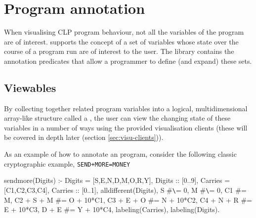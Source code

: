 %
% 
% 
% 
% 

\chapter{Program annotation}
When visualising CLP program behaviour, not all the variables of the
program are of interest.  {\eclipse} supports the concept of a set of
\viewable{} variables whose state over the course of a program run are
of interest to the user.  The library
 contains the
annotation predicates that allow a programmer to define (and expand)
these \viewable{} sets.


\section{Viewables}
\label{sec:viewables}
By collecting together related program
variables into a logical, multidimensional array-like structure called
a \viewable{}, the user can view the changing state of these variables
in a number of ways using the provided visualisation clients (these
will be covered in depth later (section \ref{sec:visu-clients})).

As an example of how to annotate an {\eclipse} program, consider the
following classic cryptographic example, \texttt{SEND+MORE=MONEY}

\begin{code}
sendmore(Digits) :-
    Digits = [S,E,N,D,M,O,R,Y],
    Digits :: [0..9],
    Carries = [C1,C2,C3,C4],
    Carries :: [0..1],
    alldifferent(Digits),
    S #\verb+\+= 0,
    M #\verb+\+= 0,
    C1         #= M,
    C2 + S + M #= O + 10*C1,
    C3 + E + O #= N + 10*C2,
    C4 + N + R #= E + 10*C3,
         D + E #= Y + 10*C4,
    labeling(Carries),
    labeling(Digits).
\end{code}


